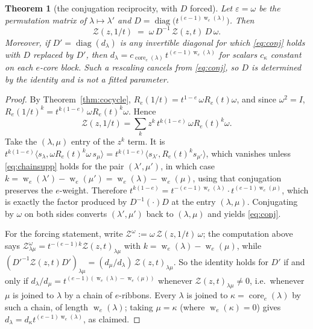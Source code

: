 \documentclass[11pt]{article}
\newtheorem{theorem}{Theorem}[section]
\theoremstyle{definition}
\theoremstyle{remark}
\newcommand{\wgt}{\operatorname{w}}
\newcommand{\core}{\operatorname{core}}
\newcommand{\Zc}{\mathcal{Z}}
\begin{document}
\begin{theorem}[the conjugation reciprocity, with $D$ forced]\label{thm:conj}
Let $\varepsilon=\omega$ be the permutation matrix of $\lambda\mapsto\lambda'$ and
$D=\operatorname{diag}\bigl(t^{(e-1)\wgt_e(\lambda)}\bigr)$.  Then
\begin{equation}\label{eq:conj}
  \Zc(z,1/t)\;=\;\omega\,D^{-1}\,\Zc(z,t)\,D\,\omega .
\end{equation}
Moreover, if $D'=\operatorname{diag}(d_\lambda)$ is any invertible diagonal for which
\eqref{eq:conj} holds with $D$ replaced by $D'$, then
$d_\lambda=c_{\core_e(\lambda)}\,t^{(e-1)\wgt_e(\lambda)}$ for scalars $c_\kappa$ constant on
each $e$-core block.  Such a rescaling cancels from \eqref{eq:conj}, so $D$ is determined by
the identity and is not a fitted parameter.
\end{theorem}

\begin{proof}
By Theorem~\ref{thm:cocycle}, $R_e(1/t)=t^{1-e}\,\omega R_e(t)\omega$, and since $\omega^2=I$,
$R_e(1/t)^k=t^{k(1-e)}\,\omega R_e(t)^k\omega$.  Hence
\[
  \Zc(z,1/t)=\sum_k z^k\,t^{k(1-e)}\,\omega R_e(t)^k\omega .
\]
Take the $(\lambda,\mu)$ entry of the $z^k$ term.  It is
$t^{k(1-e)}\langle s_\lambda,\omega R_e(t)^k\omega\, s_\mu\rangle
 =t^{k(1-e)}\langle s_{\lambda'},R_e(t)^ks_{\mu'}\rangle$,
which vanishes unless \eqref{eq:chainsupp} holds for the pair $(\lambda',\mu')$, in which
case $k=\wgt_e(\lambda')-\wgt_e(\mu')=\wgt_e(\lambda)-\wgt_e(\mu)$, using that conjugation
preserves the $e$-weight.  Therefore
$t^{k(1-e)}=t^{-(e-1)\wgt_e(\lambda)}\cdot t^{(e-1)\wgt_e(\mu)}$, which is exactly the factor
produced by $D^{-1}(\cdot)D$ at the entry $(\lambda,\mu)$.  Conjugating by $\omega$ on both
sides converts $(\lambda',\mu')$ back to $(\lambda,\mu)$ and yields \eqref{eq:conj}.

For the forcing statement, write $\Zc^{\omega}:=\omega\,\Zc(z,1/t)\,\omega$; the computation
above says $\Zc^{\omega}_{\lambda\mu}=t^{-(e-1)k}\Zc(z,t)_{\lambda\mu}$ with
$k=\wgt_e(\lambda)-\wgt_e(\mu)$, while
$(D'^{-1}\Zc(z,t)D')_{\lambda\mu}=(d_\mu/d_\lambda)\,\Zc(z,t)_{\lambda\mu}$.  So the identity
holds for $D'$ if and only if $d_\lambda/d_\mu=t^{(e-1)(\wgt_e(\lambda)-\wgt_e(\mu))}$
whenever $\Zc(z,t)_{\lambda\mu}\ne0$, i.e.\ whenever $\mu$ is joined to $\lambda$ by a chain
of $e$-ribbons.  Every $\lambda$ is joined to $\kappa=\core_e(\lambda)$ by such a chain, of
length $\wgt_e(\lambda)$; taking $\mu=\kappa$ (where $\wgt_e(\kappa)=0$) gives
$d_\lambda=d_\kappa t^{(e-1)\wgt_e(\lambda)}$, as claimed.
\end{proof}
\end{document}
